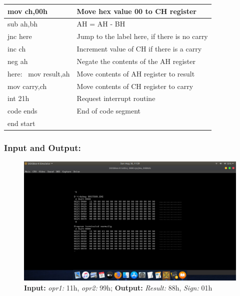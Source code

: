 \documentclass[12pt,a4paper]{article}
\begin{document}
\begin{flushleft}
\begin{table}[htb]
{\begin{tabular}{|l|l|}
\hline
mov ch,00h                                                       & Move hex value 00 to CH register              \\ 
\hline
sub ah,bh                                                        & AH = AH - BH                                  \\ 
\hline
jnc here                                                         & Jump to the label here, if there is no carry  \\ 
\hline
inc ch                                                           & Increment value of CH if there is a carry     \\ 
\hline
neg ah                                                           & Negate the contents of the AH register        \\
\hline
here:~ mov result,ah                                             & Move contents of AH register to result        \\ 
\hline
mov carry,ch                                                     & Move contents of CH register to carry         \\ 
\hline
int 21h                                                          & Request interrupt routine                     \\ 
\hline
code ends                                                        & End of code segment                           \\
\hline
end start                                                        &                                               \\
\hline
\end{tabular}
}
\end{table}

\newpage
\subsubsection*{\textbf{Input and Output:}}
\begin{figure}[h]
    \centering
    \includegraphics[trim = 100mm 70mm 100mm 80mm, clip, width = \textwidth]{Subtraction.png}
    \caption{ \textbf{Input:} \emph{opr1:} 11h, \emph{opr2:} 99h; 
              \textbf{Output:} \emph{Result:} 88h, \emph{Sign:} 01h}
\end{figure}



\end{flushleft}
\end{document}
